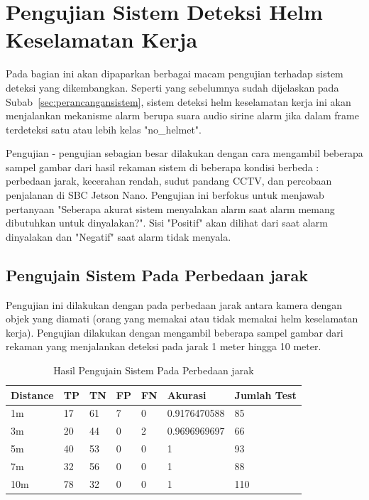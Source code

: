 \section{Pengujian Sistem Deteksi Helm Keselamatan Kerja}
\label{sec:system_check}

\par Pada bagian ini akan dipaparkan berbagai macam pengujian terhadap sistem deteksi yang dikembangkan. Seperti yang sebelumnya sudah dijelaskan pada Subab~\ref{sec:perancangansistem}, sistem deteksi helm keselamatan kerja ini akan menjalankan mekanisme alarm berupa suara audio sirine alarm jika dalam frame terdeteksi satu atau lebih kelas "no\_helmet".

\par Pengujian - pengujian sebagian besar dilakukan dengan cara mengambil beberapa sampel gambar dari hasil rekaman sistem di beberapa kondisi berbeda : perbedaan jarak, kecerahan rendah, sudut pandang CCTV, dan percobaan penjalanan di SBC Jetson Nano. Pengujian ini berfokus untuk menjawab pertanyaan "Seberapa akurat sistem menyalakan alarm saat alarm memang dibutuhkan untuk dinyalakan?". Sisi "Positif" akan dilihat dari saat alarm dinyalakan dan "Negatif" saat alarm tidak menyala. 

\subsection{Pengujain Sistem Pada Perbedaan jarak}
\label{subsec:systest_test_dist}

\par Pengujian ini dilakukan dengan pada perbedaan jarak antara kamera dengan objek yang diamati (orang yang memakai atau tidak memakai helm keselamatan kerja). Pengujian dilakukan dengan mengambil beberapa sampel gambar dari rekaman yang menjalankan deteksi pada jarak 1 meter hingga 10 meter.

\begin{table}
    \centering
    \caption{Hasil Pengujain Sistem Pada Perbedaan jarak}
    \label{tb:systest_dist_test}
    \begin{tabular}{|l|l|l|l|l|l|l|} 
    \hline
    Distance & TP & TN & FP & FN & Akurasi    & Jumlah Test  \\ 
    \hline
    1m       & 17 & 61 & 7  & 0  & 0.9176470588 & 85               \\ 
    \hline
    3m       & 20 & 44 & 0  & 2  & 0.9696969697 & 66               \\ 
    \hline
    5m       & 40 & 53 & 0  & 0  & 1            & 93               \\ 
    \hline
    7m       & 32 & 56 & 0  & 0  & 1            & 88               \\ 
    \hline
    10m      & 78 & 32 & 0  & 0  & 1            & 110              \\
    \hline
    \end{tabular}
\end{table}

